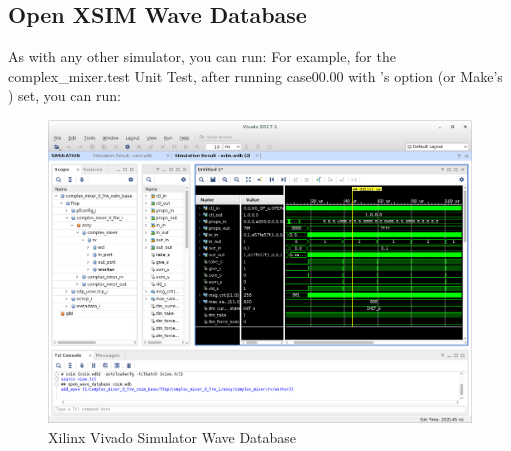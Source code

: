 \begin{flushleft}
\subsection{Open XSIM Wave Database}
As with any other simulator, you can run:\newline
{}\newline
For example, for the complex\_mixer.test Unit Test, after running case00.00 with 's  option (or Make's ) set, you can run:\newline
{}
\begin{figure}[H]
	\centerline{\includegraphics[scale=0.4]{figures/xilinx_xsim_ocpiview}}
	\caption{Xilinx Vivado Simulator Wave Database}
\end{figure}



\end{flushleft}
